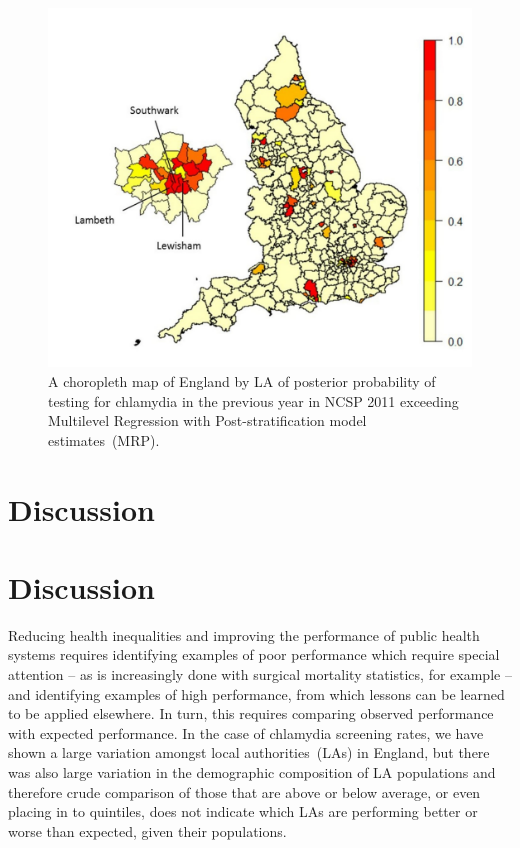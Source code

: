 \documentclass[fleqn,10pt]{wlscirep}
\begin{document}
\begin{figure}[!ht]
\centering
\includegraphics[width=5in]{Figure-6__Green__choropleth-map}
\caption{A choropleth map of England by LA of posterior probability of testing for chlamydia in the previous year in
NCSP 2011 exceeding Multilevel Regression with Post-stratification model estimates~(MRP).}
\label{fig:choropleth}
\end{figure}

\section*{Discussion}

\section*{Discussion}
Reducing health inequalities and improving the performance of public health systems requires identifying examples of poor performance which require special attention – as is increasingly done with surgical mortality statistics, for example – and identifying examples of high performance, from which lessons can be learned to be applied elsewhere. In turn, this requires comparing observed performance with expected performance. In the case of chlamydia screening rates, we have shown a large variation amongst local authorities~(LAs) in England, but there was also large variation in the demographic composition of LA populations and therefore crude comparison of those that are above or below average, or even placing in to quintiles, does not indicate which LAs are performing better or worse than expected, given their populations.
\end{document}
